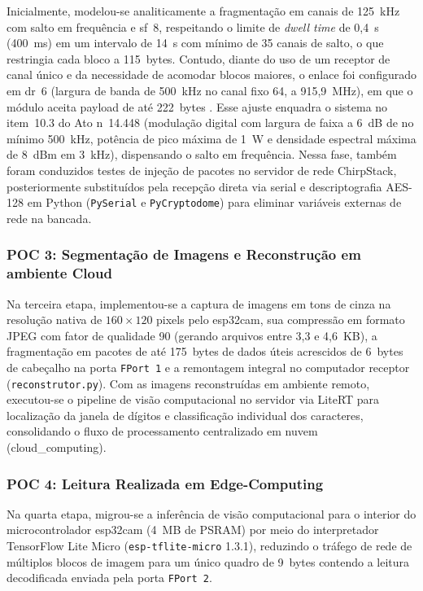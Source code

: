 Inicialmente, modelou-se analiticamente a fragmentação em canais de 125~kHz com salto em
frequência e \gls{sf}~8, respeitando o limite de \textit{dwell time} de 0,4~s (400~ms) em
um intervalo de 14~s com mínimo de 35 canais de salto, o que restringia cada bloco a
115~bytes. Contudo, diante do uso de um receptor de canal único e da necessidade de
acomodar blocos maiores, o enlace foi configurado em \gls{dr}~6 (largura de banda de
500~kHz no canal fixo 64, a 915,9~MHz), em que o módulo aceita \gls{payload} de até
222~bytes \cite{radioenge2022}. Esse ajuste enquadra o sistema no item~10.3 do
Ato n\textordmasculine~14.448 (modulação digital com largura de faixa a 6~dB de no mínimo
500~kHz, potência de pico máxima de 1~W e densidade espectral máxima de 8~dBm em 3~kHz),
dispensando o salto em frequência. Nessa fase, também foram conduzidos
testes de injeção de pacotes no servidor de rede ChirpStack,
posteriormente substituídos pela recepção direta via serial e descriptografia AES-128
em Python (\texttt{PySerial} e \texttt{PyCryptodome}) para eliminar variáveis externas de
rede na bancada.

\subsubsection{POC 3: Segmentação de Imagens e Reconstrução em ambiente Cloud}
\label{metodologia_pesquisa:poc3}

Na terceira etapa, implementou-se a captura de imagens em tons de cinza na resolução nativa
de $160 \times 120$ pixels pelo \gls{esp32cam}, sua compressão em formato JPEG com fator
de qualidade 90 (gerando arquivos entre 3,3 e 4,6~KB), a fragmentação em pacotes de até
175~bytes de dados úteis acrescidos de 6~bytes de cabeçalho na porta \texttt{FPort~1} e a
remontagem integral no computador receptor (\texttt{reconstrutor.py}). Com as imagens
reconstruídas em ambiente remoto, executou-se o pipeline de visão computacional no
servidor via LiteRT para localização da janela de dígitos e classificação individual dos
caracteres, consolidando o fluxo de processamento centralizado em nuvem
(\gls{cloud_computing}).

\subsubsection{POC 4: Leitura Realizada em Edge-Computing}
\label{metodologia_pesquisa:poc4}

Na quarta etapa, migrou-se a inferência de visão computacional para o interior do
microcontrolador \gls{esp32cam} (4~MB de PSRAM) por meio do interpretador TensorFlow Lite
Micro (\texttt{esp-tflite-micro} 1.3.1), reduzindo o tráfego de rede de múltiplos blocos
de imagem para um único quadro de 9~bytes contendo a leitura decodificada enviada pela
porta \texttt{FPort~2}.

